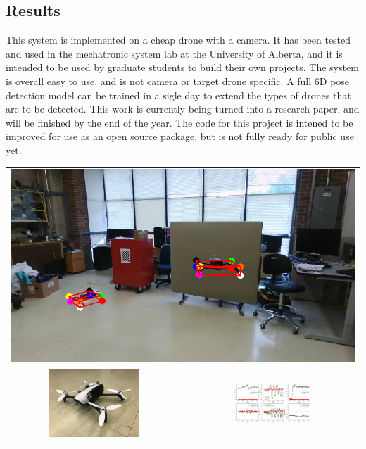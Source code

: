 \documentclass[11pt]{article}
\begin{document}
\subsection*{Results}
This system is implemented on a cheap drone with a camera. It has been tested and used in the mechatronic system lab at the University of Alberta, and it is intended to be used by graduate students to build their own projects. The system is overall easy to use, and is not camera or target drone specific. A full 6D pose detection model can be trained in a sigle day to extend the types of drones that are to be detected. This work is currently being turned into a research paper, and will be finished by the end of the year. The code for this project is intened to be improved for use as an open source package, but is not fully ready for public use yet.

\vspace{-6mm}
\begin{center}
    \begin{tabular}{cc}
        \multicolumn{2}{c}{\includegraphics[width=\textwidth, trim={0mm, 35mm, 0mm, 60mm}, clip]{images/pose_detection_picture.png}}\\
        \includegraphics[width=0.54\textwidth, trim={50mm, 100mm, 100mm, 100mm}, clip]{images/bebop2_with_motion_balls.jpg} & \includegraphics[width=0.46\textwidth, trim={111mm, 86mm, 113mm, 0 mm}, clip]{images/pose_detection_front_back_movement_plot.png} \\
    \end{tabular}
\end{center}
\newpage
\end{document}
